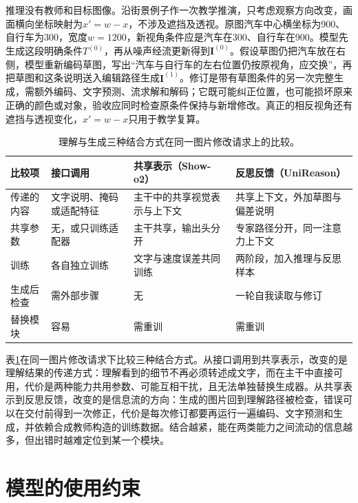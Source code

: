 推理没有教师和目标图像。沿街景例子作一次教学推演，只考虑观察方向改变，画面横向坐标映射为$x'=w-x$，不涉及遮挡及透视。原图汽车中心横坐标为900、自行车为300，宽度$w=1200$，新视角条件应是汽车在300、自行车在900。模型先生成这段明确条件$T^{(0)}$，再从噪声经流更新得到$\bm I^{(0)}$。假设草图仍把汽车放在右侧，模型重新编码草图，写出“汽车与自行车的左右位置仍按原视角，应交换”，再把草图和这条说明送入编辑路径生成$\bm I^{(1)}$。修订是带有草图条件的另一次完整生成，需额外编码、文字预测、流求解和解码；它既可能纠正位置，也可能损坏原来正确的颜色或对象，验收应同时检查原条件保持与新增修改。真正的相反视角还有遮挡与透视变化，$x'=w-x$只用于教学复算。

\begin{table}[htbp]
  \centering
  \small
  \begin{tabularx}{\linewidth}{@{}p{18mm}XXX@{}}
    \toprule
    比较项 & 接口调用 & 共享表示（Show-o2） & 反思反馈（UniReason）\\
    \midrule
    传递的内容 & 文字说明、掩码或适配特征 & 主干中的共享视觉表示与上下文 & 共享上下文，外加草图与偏差说明\\
    共享参数 & 无，或只训练适配器 & 主干共享，输出头分开 & 专家路径分开，同一注意力上下文\\
    训练 & 各自独立训练 & 文字与速度误差共同训练 & 两阶段，加入推理与反思样本\\
    生成后检查 & 需外部步骤 & 无 & 一轮自我读取与修订\\
    替换模块 & 容易 & 需重训 & 需重训\\
    \bottomrule
  \end{tabularx}
  \caption{理解与生成三种结合方式在同一图片修改请求上的比较。}
  \label{tab:vision-models-unified-compare}
\end{table}

表\ref{tab:vision-models-unified-compare}在同一图片修改请求下比较三种结合方式。从接口调用到共享表示，改变的是理解结果的传递方式：理解看到的细节不再必须转述成文字，而在主干中直接可用，代价是两种能力共用参数、可能互相干扰，且无法单独替换生成器。从共享表示到反思反馈，改变的是信息流的方向：生成的图片回到理解路径被检查，错误可以在交付前得到一次修正，代价是每次修订都要再运行一遍编码、文字预测和生成，并依赖合成教师构造的训练数据。结合越紧，能在两类能力之间流动的信息越多，但出错时越难定位到某一个模块。

\section{模型的使用约束}
\label{sec:vision-models-constraints}

